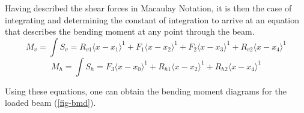 Having  described the shear forces in Macaulay Notation, it is then the case of integrating and determining the constant of integration to arrive at an equation that describes the bending moment at any point through the beam.
\begin{equation}
  M_v = \int S_v = R_{v1}\langle x-x_1\rangle^1 + F_{1}\langle x-x_2\rangle^1  + F_{2}\langle x-x_3\rangle^1 + R_{v2}\langle x-x_4\rangle^1
\end{equation}
\begin{equation}
  M_h = \int S_h = F_{3}\langle x-x_0\rangle^1 + R_{h1}\langle x-x_2\rangle^1 + R_{h2}\langle x-x_4\rangle^1
\end{equation}

Using these equations, one can obtain the bending moment diagrams for the loaded beam (\cref{fig-bmd}).

